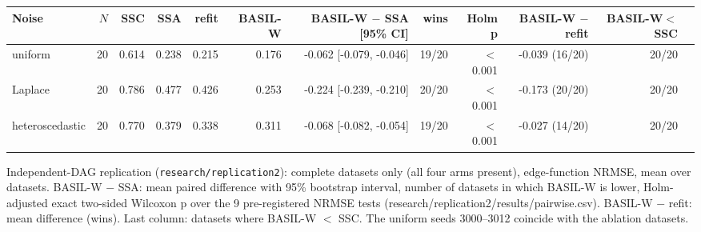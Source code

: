 \begin{adjustbox}{max width=\textwidth}
\begin{tabular}{lrrrrrrrrrrr}
\toprule
Noise & $N$ & SSC & SSA & refit & BASIL-W & BASIL-W $-$ SSA [95\% CI] & wins & Holm p & BASIL-W $-$ refit & BASIL-W$<$SSC \\
\midrule
uniform & 20 & 0.614 & 0.238 & 0.215 & 0.176 & -0.062 [-0.079, -0.046] & 19/20 & $<$0.001 & -0.039 (16/20) & 20/20 \\
Laplace & 20 & 0.786 & 0.477 & 0.426 & 0.253 & -0.224 [-0.239, -0.210] & 20/20 & $<$0.001 & -0.173 (20/20) & 20/20 \\
heteroscedastic & 20 & 0.770 & 0.379 & 0.338 & 0.311 & -0.068 [-0.082, -0.054] & 19/20 & $<$0.001 & -0.027 (14/20) & 20/20 \\
\bottomrule
\end{tabular}
\end{adjustbox}

\smallskip
{\footnotesize Independent-DAG replication (\texttt{research/replication2}): complete datasets only (all four arms present), edge-function NRMSE, mean over datasets. BASIL-W $-$ SSA: mean paired difference with 95\% bootstrap interval, number of datasets in which BASIL-W is lower, Holm-adjusted exact two-sided Wilcoxon p over the 9 pre-registered NRMSE tests (research/replication2/results/pairwise.csv). BASIL-W $-$ refit: mean difference (wins). Last column: datasets where BASIL-W $<$ SSC. The uniform seeds 3000--3012 coincide with the ablation datasets.}
